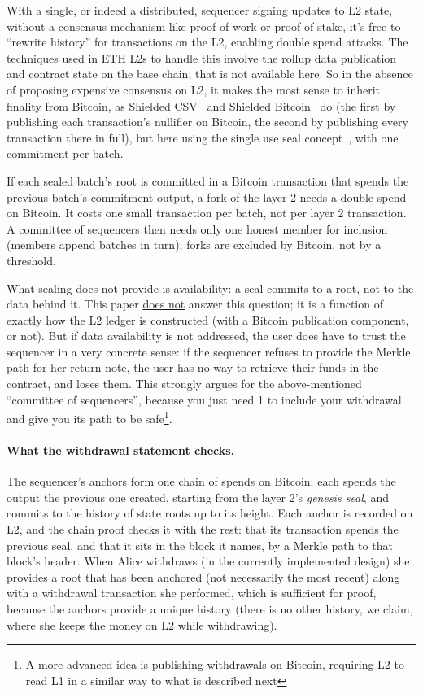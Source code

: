 \documentclass[11pt]{article}
\begin{document}
With a single, or indeed a distributed, sequencer signing updates to L2 state, without a consensus mechanism like proof of work or proof of stake, it's free to ``rewrite history'' for transactions on the L2, enabling double spend attacks. The techniques used in ETH L2s to handle this involve the rollup data publication and contract state on the base chain; that is not available here. So in the absence of proposing expensive consensus on L2, it makes the most sense to inherit finality from Bitcoin, as Shielded CSV~\cite{shieldedcsv} and Shielded Bitcoin~\cite{shieldedbtc} do (the first by publishing each transaction's nullifier on Bitcoin, the second by publishing every transaction there in full), but here using the single use seal concept~\cite{toddseals}, with one commitment per batch.

If each sealed batch's root is committed in a Bitcoin transaction that spends the previous batch's commitment output, a fork of the layer 2 needs a double spend on Bitcoin. It costs one small transaction per batch, not per layer 2 transaction. A committee of sequencers then needs only one honest member for inclusion (members append batches in turn); forks are excluded by Bitcoin, not by a threshold.

What sealing does not provide is availability: a seal commits to a root, not to the data behind it. This paper \underline{does not} answer this question; it is a function of exactly how the L2 ledger is constructed (with a Bitcoin publication component, or not). But if data availability is not addressed, the user does have to trust the sequencer in a very concrete sense: if the sequencer refuses to provide the Merkle path for her return note, the user has no way to retrieve their funds in the contract, and loses them. This strongly argues for the above-mentioned ``committee of sequencers'', because you just need 1 to include your withdrawal and give you its path to be safe\footnote{A more advanced idea is publishing withdrawals on Bitcoin, requiring L2 to read L1 in a similar way to what is described next}.

\paragraph{What the withdrawal statement checks.} The sequencer's
anchors form one chain of spends on Bitcoin: each spends the output the
previous one created, starting from the layer 2's \emph{genesis seal},
and commits to the history of state roots up to its height. Each anchor
is recorded on L2, and the chain proof
checks it with the rest: that its transaction spends the previous seal, and
that it sits in the block it names, by a Merkle path to that block's
header. 
When Alice withdraws (in the currently implemented design) she provides a root that has been anchored (not necessarily the most recent) along with a withdrawal transaction she performed, which is sufficient for proof, because the anchors provide a unique history (there is no other history, we claim, where she keeps the money on L2 while withdrawing).
\end{document}
